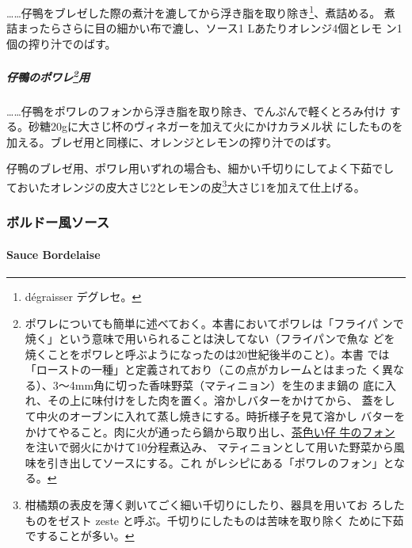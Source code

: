 \begin{recette}
\ldots{}\ldots{}仔鴨をブレゼした際の煮汁を漉してから浮き脂を取り除き\footnote{dégraisser
  デグレセ。}、煮詰める。 煮詰まったらさらに目の細かい布で漉し、ソース1
Lあたりオレンジ4個とレモ ン1個の搾り汁でのばす。

\hypertarget{ux4ed4ux9d28ux306eux30ddux30efux30ec3ux7528}{%
\subparagraph[仔鴨のポワレ用]{\texorpdfstring{仔鴨のポワレ\footnote{ポワレについても簡単に述べておく。本書においてポワレは「フライパ
  ンで焼く」という意味で用いられることは決してない（フライパンで魚な
  どを焼くことをポワレと呼ぶようになったのは20世紀後半のこと）。本書
  では「ローストの一種」と定義されており（この点がカレームとはまった
  く異なる）、3〜4mm角に切った香味野菜（マティニョン）を生のまま鍋の
  底に入れ、その上に味付けをした肉を置く。溶かしバターをかけてから、
  蓋をして中火のオーブンに入れて蒸し焼きにする。時折様子を見て溶かし
  バターをかけてやること。肉に火が通ったら鍋から取り出し、\protect\hyperlink{fonds-de-veau-brun}{茶色い仔
  牛のフォン}を注いで弱火にかけて10分程煮込み、
  マティニョンとして用いた野菜から風味を引き出してソースにする。これ
  がレシピにある「ポワレのフォン」となる。}用}{仔鴨のポワレ用}}\label{ux4ed4ux9d28ux306eux30ddux30efux30ec3ux7528}}

\ldots{}\ldots{}仔鴨をポワレのフォンから浮き脂を取り除き、でんぷんで軽くとろみ付け
する。砂糖20gに大さじ\undemi{}杯のヴィネガーを加えて火にかけカラメル状
にしたものを加える。ブレゼ用と同様に、オレンジとレモンの搾り汁でのばす。

仔鴨のブレゼ用、ポワレ用いずれの場合も、細かい千切りにしてよく下茹でし
ておいたオレンジの皮大さじ2とレモンの皮\footnote{柑橘類の表皮を薄く剥いてごく細い千切りにしたり、器具を用いてお
  ろしたものをゼスト zeste と呼ぶ。千切りにしたものは苦味を取り除く
  ために下茹ですることが多い。}大さじ1を加えて仕上げる。

\maeaki

\hypertarget{ux30dcux30ebux30c9ux30fcux98a8ux30bdux30fcux30b9}{%
\subsubsection{ボルドー風ソース}\label{ux30dcux30ebux30c9ux30fcux98a8ux30bdux30fcux30b9}}

\hypertarget{sauce-bordelaise}{%
\paragraph{Sauce Bordelaise}\label{sauce-bordelaise}}



\end{recette}

